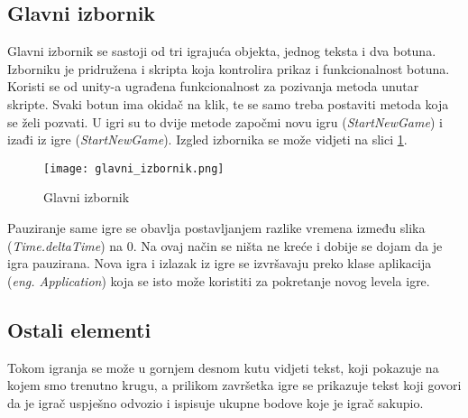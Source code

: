 \subsection{Glavni izbornik}
Glavni izbornik se sastoji od tri igrajuća objekta, jednog teksta i dva botuna. Izborniku je pridružena i skripta koja kontrolira prikaz i funkcionalnost botuna. Koristi se od unity-a ugrađena funkcionalnost za pozivanja metoda unutar skripte. Svaki botun ima okidač na klik, te se samo treba postaviti metoda koja se želi pozvati. U igri su to dvije metode započmi novu igru (\emph{StartNewGame}) i izađi iz igre (\emph{StartNewGame}). Izgled izbornika se može vidjeti na slici \ref{fig:glavniIzbornik}.
\begin{figure}[h]
	\texttt{[image: glavni\_izbornik.png]}
	\centering
	\caption{Glavni izbornik}
	\label{fig:glavniIzbornik}
\end{figure}
\newline
Pauziranje same igre se obavlja postavljanjem razlike vremena između slika (\emph{Time.deltaTime}) na 0. Na ovaj način se ništa ne kreće i dobije se dojam da je igra pauzirana. Nova igra i izlazak iz igre se izvršavaju preko klase aplikacija (\emph{eng. Application}) koja se isto može koristiti za pokretanje novog levela igre.
\newpage
\subsection{Ostali elementi}
Tokom igranja se može u gornjem desnom kutu vidjeti tekst, koji pokazuje na kojem smo trenutno krugu, a prilikom završetka igre se prikazuje tekst koji govori da je igrač uspješno odvozio i ispisuje ukupne bodove koje je igrač sakupio.
